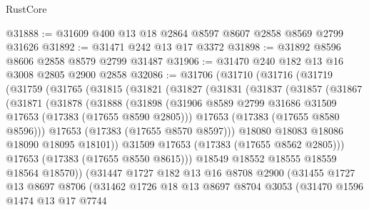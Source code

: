 \begin{lexlean}{RustCore}
\begin{coremodule}
@31888 := @31609 @400 @13 @18 @2864 @8597 @8607 @2858 @8569 @2799 @31626
@31892 := @31471 @242 @13 @17 @3372
@31898 := @31892 @8596 @8606 @2858 @8579 @2799 @31487
@31906 := @31470 @240 @182 @13 @16 @3008 @2805 @2900 @2858
@32086 := @31706
    (@31710
      (@31716
        (@31719
          (@31759
            (@31765
              (@31815
                (@31821
                  (@31827
                    (@31831
                      (@31837
                        (@31857
                          (@31867
                            (@31871
                              (@31878
                                (@31888
                                  (@31898
                                    (@31906
                                      @8589
                                      @2799
                                      @31686
                                      @31509
                                      @17653
                                      (@17383 (@17655 @8590 @2805)))
                                    @17653
                                    (@17383 (@17655 @8580 @8596)))
                                  @17653
                                  (@17383 (@17655 @8570 @8597)))
                                @18080
                                @18083
                                @18086
                                @18090
                                @18095
                                @18101))
                            @31509
                            @17653
                            (@17383 (@17655 @8562 @2805)))
                          @17653
                          (@17383 (@17655 @8550 @8615)))
                        @18549
                        @18552
                        @18555
                        @18559
                        @18564
                        @18570))
                    (@31447
                      @1727
                      @182
                      @13
                      @16
                      @8708
                      @2900
                      (@31455
                        @1727
                        @13
                        @8697
                        @8706
                        (@31462
                          @1726
                          @18
                          @13
                          @8697
                          @8704
                          @3053
                          (@31470
                            @1596
                            @1474
                            @13
                            @17
                            @7744

\end{coremodule}
\end{lexlean}
